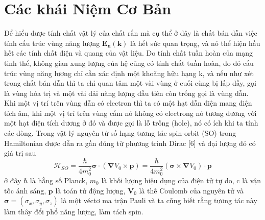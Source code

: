 \chapter{Các khái Niệm Cơ Bản}
  \label{Chapter1} %

  Để hiểu được tính chất vật lý của chất rắn mà cụ thể ở đây là chất bán dẫn việc tính  cấu trúc vùng năng lượng $\mathbf{E_n(k)}$ là hết sức quan trọng, và nó thể hiện hầu hết các tính chất điện và quang của vật liệu. Do tính chất tuần hoàn của mạng tinh thể, không gian xung lượng của hệ cũng có tính chất tuần hoàn, do đó cấu trúc vùng năng lượng chỉ cần xác định một khoãng hữu hạng k, và nếu như xét trong chất bán dẫn thì ta chỉ quan tâm một vài vùng ở cuối cùng bị lấp đầy, gọi là vùng hóa trị và một vài dải năng lượng đầu tiên còn trống gọi là vùng dẫn. Khi một vị trí trên vùng dẫn có electron thì ta có một hạt dẫn điện mang điện tích âm, khi một vị trí trên vùng cấm nó không có electrong nó tương đương với một hạt điện tích dương ở đó và được gọi là lỗ trống (hole), nó có ích khi ta tính các dòng. 
  Trong vật lý nguyên tử số hạng tương tác spin-orbit (SO) trong Hamiltonian được dẫn ra gần đúng từ phương trình Dirac [6] và đại lượng đó có giá trị sau
  \begin{equation}
  \mathcal{H}_{SO} = \frac{\hbar}{4m^2_0}\boldsymbol{\sigma} \cdot \left(\boldsymbol{\nabla} V_0\times \boldsymbol{p} \right) =  \frac{\hbar}{4m^2_0}\left(\boldsymbol{\sigma}\times \boldsymbol{\nabla}V_0\right)\cdot\boldsymbol{p}
  \end{equation}
  ở đây $\hbar$ là hằng số Planck, $m_0$ là khối lượng hiệu dụng của điện tử tự do, c là vận tốc ánh sáng, $\mathbf{p}$ là toán tử động lượng, $\mathbf{V}_0$ là thế Coulomb của nguyên tử và $\boldsymbol{\sigma} = \left(\sigma_x,\sigma_y,\sigma_z\right)$ là một véctơ ma trận Pauli và ta cũng biết rằng tương tác này làm thây đổi phổ năng lượng, làm tách spin.
